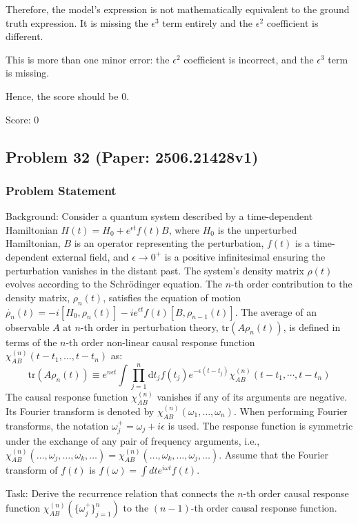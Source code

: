 \documentclass[10pt]{article}
\begin{document}
Therefore, the model's expression is not mathematically equivalent to the ground truth expression. It is missing the \(\epsilon^3\) term entirely and the \(\epsilon^2\) coefficient is different.

This is more than one minor error: the \(\epsilon^2\) coefficient is incorrect, and the \(\epsilon^3\) term is missing.

Hence, the score should be 0.

Score: 0

\newpage
\subsection*{Problem 32 (Paper: 2506.21428v1)}
\subsubsection*{Problem Statement}
Background:
Consider a quantum system described by a time-dependent Hamiltonian $H(t) = H_0 + e^{\epsilon t}f(t)B$, where $H_0$ is the unperturbed Hamiltonian, $B$ is an operator representing the perturbation, $f(t)$ is a time-dependent external field, and $\epsilon \rightarrow 0^+$ is a positive infinitesimal ensuring the perturbation vanishes in the distant past. The system's density matrix $\rho(t)$ evolves according to the Schr\"odinger equation. The $n$-th order contribution to the density matrix, $\rho_n(t)$, satisfies the equation of motion $\dot{\rho_n}(t) = -i[H_0, \rho_n(t)] - ie^{\epsilon t}f(t)[B, \rho_{n-1}(t)]$. The average of an observable $A$ at $n$-th order in perturbation theory, $\mathrm{tr}(A\rho_n(t))$, is defined in terms of the $n$-th order non-linear causal response function $\chi^{(n)}_{AB}(t-t_1, \dots, t-t_n)$ as:
$$ \mathrm{tr}(A\rho_n(t)) \equiv e^{n\epsilon t}\int\prod_{j=1}^n\mathrm{d}t_j f(t_j)e^{-\epsilon(t-t_j)}\chi^{(n)}_{AB}(t-t_1,\cdots,t-t_n) $$
The causal response function $\chi^{(n)}_{AB}$ vanishes if any of its arguments are negative. Its Fourier transform is denoted by $\chi^{(n)}_{AB}(\omega_1, \dots, \omega_n)$. When performing Fourier transforms, the notation $\omega_j^+ = \omega_j + i\epsilon$ is used. The response function is symmetric under the exchange of any pair of frequency arguments, i.e., $\chi^{(n)}_{AB}(\dots, \omega_j, \dots, \omega_k, \dots) = \chi^{(n)}_{AB}(\dots, \omega_k, \dots, \omega_j, \dots)$. Assume that the Fourier transform of $f(t)$ is $f(\omega) = \int dt e^{i\omega t} f(t)$.

Task:
Derive the recurrence relation that connects the $n$-th order causal response function $\chi^{(n)}_{AB}(\{\omega^+_j\}_{j=1}^n)$ to the $(n-1)$-th order causal response function.
\end{document}
